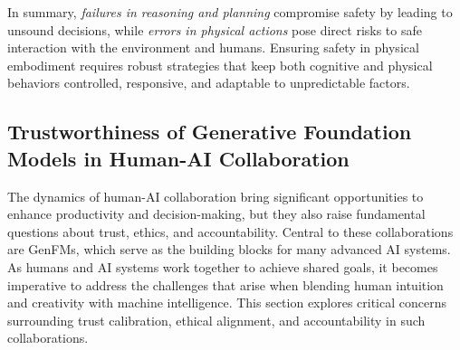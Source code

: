 In summary, \textit{failures in reasoning and planning} compromise safety by leading to unsound decisions, while \textit{errors in physical actions} pose direct risks to safe interaction with the environment and humans. Ensuring safety in physical embodiment requires robust strategies that keep both cognitive and physical behaviors controlled, responsive, and adaptable to unpredictable factors.

\subsection{Trustworthiness of Generative Foundation Models in Human-AI Collaboration}
The dynamics of human-AI collaboration bring significant opportunities to enhance productivity and decision-making, but they also raise fundamental questions about trust, ethics, and accountability. Central to these collaborations are GenFMs, which serve as the building blocks for many advanced AI systems. As humans and AI systems work together to achieve shared goals, it becomes imperative to address the challenges that arise when blending human intuition and creativity with machine intelligence. This section explores critical concerns surrounding trust calibration, ethical alignment, and accountability in such collaborations.

